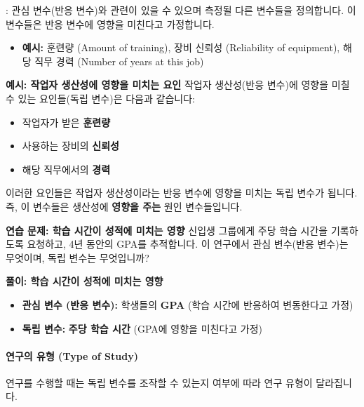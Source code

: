 \documentclass[11pt,a4paper]{article}
\theoremstyle{definition}
\begin{document}
\begin{tcolorbox}[infobox, title={연구 시작의 두 번째 단계: 독립 변수 정의 (Step Two in Initiating a Study)}]
: 관심 변수(반응 변수)와 관련이 있을 수 있으며 측정될 다른 변수들을 정의합니다. 이 변수들은 반응 변수에 영향을 미친다고 가정합니다.
\begin{itemize}
    \item \textbf{예시:} 훈련량 (Amount of training), 장비 신뢰성 (Reliability of equipment), 해당 직무 경력 (Number of years at this job)
\end{itemize}
\end{tcolorbox}

\begin{examplebox}
\textbf{예시: 작업자 생산성에 영향을 미치는 요인}
작업자 생산성(반응 변수)에 영향을 미칠 수 있는 요인들(독립 변수)은 다음과 같습니다:
\begin{itemize}
    \item 작업자가 받은 \textbf{훈련량}
    \item 사용하는 장비의 \textbf{신뢰성}
    \item 해당 직무에서의 \textbf{경력}
\end{itemize}
이러한 요인들은 작업자 생산성이라는 반응 변수에 영향을 미치는 독립 변수가 됩니다. 즉, 이 변수들은 생산성에 \textbf{영향을 주는} 원인 변수들입니다.
\end{examplebox}

\begin{practicebox}
\textbf{연습 문제: 학습 시간이 성적에 미치는 영향}
신입생 그룹에게 주당 학습 시간을 기록하도록 요청하고, 4년 동안의 GPA를 추적합니다.
이 연구에서 관심 변수(반응 변수)는 무엇이며, 독립 변수는 무엇입니까?
\end{practicebox}

\begin{solutionbox}
\textbf{풀이: 학습 시간이 성적에 미치는 영향}
\begin{itemize}
    \item \textbf{관심 변수 (반응 변수):} 학생들의 \textbf{GPA} (학습 시간에 반응하여 변동한다고 가정)
    \item \textbf{독립 변수:} \textbf{주당 학습 시간} (GPA에 영향을 미친다고 가정)
\end{itemize}
\end{solutionbox}

\paragraph{연구의 유형 (Type of Study)}
연구를 수행할 때는 독립 변수를 조작할 수 있는지 여부에 따라 연구 유형이 달라집니다.
\end{document}
